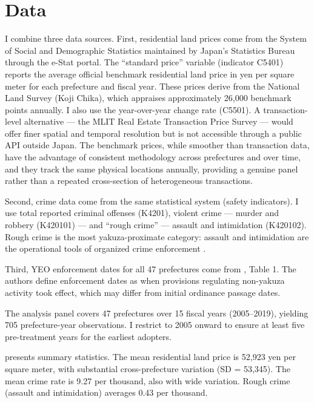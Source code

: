 \documentclass[12pt]{article}
\begin{document}
\section{Data}

I combine three data sources. First, residential land prices come from the System of Social and Demographic Statistics maintained by Japan's Statistics Bureau through the e-Stat portal. The ``standard price'' variable (indicator C5401) reports the average official benchmark residential land price in yen per square meter for each prefecture and fiscal year. These prices derive from the National Land Survey (Koji Chika), which appraises approximately 26,000 benchmark points annually. I also use the year-over-year change rate (C5501). A transaction-level alternative --- the MLIT Real Estate Transaction Price Survey --- would offer finer spatial and temporal resolution but is not accessible through a public API outside Japan. The benchmark prices, while smoother than transaction data, have the advantage of consistent methodology across prefectures and over time, and they track the same physical locations annually, providing a genuine panel rather than a repeated cross-section of heterogeneous transactions.

Second, crime data come from the same statistical system (safety indicators). I use total reported criminal offenses (K4201), violent crime --- murder and robbery (K420101) --- and ``rough crime'' --- assault and intimidation (K420102). Rough crime is the most yakuza-proximate category: assault and intimidation are the operational tools of organized crime enforcement \citep{hoshino2020containing}.

Third, YEO enforcement dates for all 47 prefectures come from \citet{hoshino2020containing}, Table 1. The authors define enforcement dates as when provisions regulating non-yakuza activity took effect, which may differ from initial ordinance passage dates.

The analysis panel covers 47 prefectures over 15 fiscal years (2005--2019), yielding 705 prefecture-year observations. I restrict to 2005 onward to ensure at least five pre-treatment years for the earliest adopters.



 presents summary statistics. The mean residential land price is 52,923 yen per square meter, with substantial cross-prefecture variation (SD = 53,345). The mean crime rate is 9.27 per thousand, also with wide variation. Rough crime (assault and intimidation) averages 0.43 per thousand.
\end{document}
